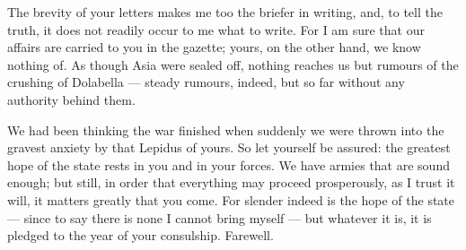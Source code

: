 

 The brevity of your letters makes me too the briefer in writing, and, to tell the truth, it does not readily occur to me what to write. For I am sure that our affairs are carried to you in the gazette; yours, on the other hand, we know nothing of. As though Asia were sealed off, nothing reaches us but rumours of the crushing of Dolabella --- steady rumours, indeed, but so far without any authority behind them.

 We had been thinking the war finished when suddenly we were thrown into the gravest anxiety by that Lepidus of yours. So let yourself be assured: the greatest hope of the state rests in you and in your forces. We have armies that are sound enough; but still, in order that everything may proceed prosperously, as I trust it will, it matters greatly that you come. For slender indeed is the hope of the state --- since to say there is none I cannot bring myself --- but whatever it is, it is pledged to the year of your consulship. Farewell.
